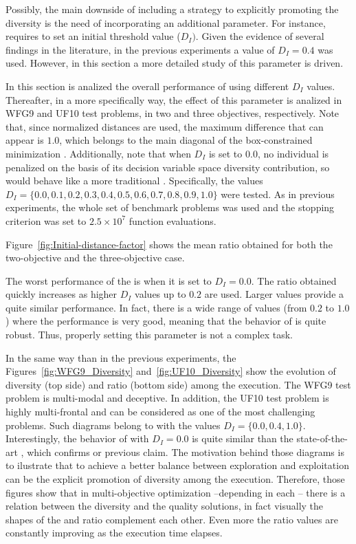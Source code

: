 Possibly, the main downside of including a strategy to explicitly promoting the diversity is the need of incorporating an additional parameter.
%
For instance, \AVSDMOEAD{} requires to set an initial threshold value ($D_I)$.
%
Given the evidence of several findings in the literature, in the previous experiments a value of $D_I=0.4$ was used.
%
However, in this section a more detailed study of this parameter is driven.
%

%
In this section is analized the overall performance of \AVSDMOEAD{} using different $D_I$ values.
%
Thereafter, in a more specifically way, the effect of this parameter is analized in WFG9 and UF10 test problems, in two and three objectives, respectively.
%
Note that, since normalized distances are used, the maximum difference that can appear is $1.0$, which belongs to the main diagonal of the box-constrained minimization \MOP{}.
%
Additionally, note that when $D_I$ is set to $0.0$, no individual is penalized on the basis of its decision variable space diversity contribution, so \AVSDMOEAD{} would behave like a more traditional \MOEA{}.
%
Specifically, the values $D_I = \{0.0, 0.1, 0.2, 0.3, 0.4, 0.5, 0.6, 0.7, 0.8, 0.9, 1.0\}$ were tested.
%
As in previous experiments, the whole set of benchmark problems was used and the stopping criterion was set to $2.5 \times 10^7$ function evaluations.

Figure~\ref{fig:Initial-distance-factor} shows the mean \HV{} ratio obtained for both the two-objective  and the three-objective case.
%

The worst performance of the \AVSDMOEAD{} is when it is set to $D_I=0.0$.
%
The \HV{} ratio obtained quickly increases as higher $D_I$ values up to $0.2$ are used.
%
Larger values provide a quite similar performance.
%
In fact, there is a wide range of values (from $0.2$ to $1.0$) where the performance is very good, meaning that the behavior of \AVSDMOEAD{} is quite robust.
%
Thus, properly setting this parameter is not a complex task.
%

In the same way than in the previous experiments, the Figures~\ref{fig:WFG9_Diversity} and~\ref{fig:UF10_Diversity} show the evolution of diversity (top side) and \HV{} ratio (bottom side) among the execution.
%
The WFG9 test problem is multi-modal and deceptive.
%
In addition, the UF10 test problem is highly multi-frontal and can be considered as one of the most challenging problems.
%
Such diagrams belong to \AVSDMOEAD{} with the values $D_I = \{0.0, 0.4, 1.0\}$.
%
Interestingly, the behavior of \AVSDMOEAD{} with $D_I=0.0$ is quite similar than the state-of-the-art \MOEAS{}, which confirms or previous claim.
%
The motivation behind those diagrams is to ilustrate that to achieve a better balance between exploration and exploitation can be the explicit promotion of diversity among the execution.
%
Therefore, those figures show that in multi-objective optimization --depending in each \MOP{}-- there is a relation between the diversity and the quality solutions, in fact visually the shapes of the \ADI{} and \HV{} ratio complement each other.
%
Even more the \HV{} ratio values are constantly improving as the execution time elapses.
%

